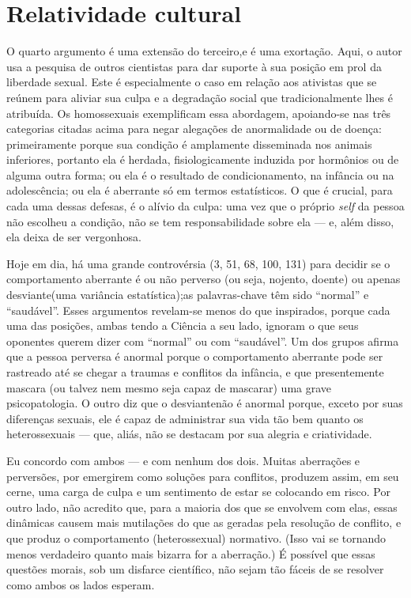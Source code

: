 \section{Relatividade cultural}

O quarto argumento é uma extensão do terceiro,\idxrela[|(] e é uma exortação.
Aqui, o autor usa a pesquisa de outros cientistas para dar suporte à
sua posição em prol da liberdade sexual. Este é especialmente o caso em
relação aos ativistas que se reúnem para aliviar sua culpa\idxculpa{} e a
degradação social que tradicionalmente lhes é atribuída. Os
homossexuais\idxhomosargu{} exemplificam essa abordagem, apoiando-se nas três
categorias citadas acima para negar alegações de anormalidade ou de
doença: primeiramente porque sua condição é amplamente disseminada nos
animais inferiores, portanto ela é herdada, fisiologicamente induzida
por hormônios ou de alguma outra forma; ou ela é o resultado de
condicionamento, na infância ou na adolescência; ou ela é aberrante só
em termos estatísticos. O que é crucial, para cada uma dessas defesas,
é o alívio da culpa:\idxculpa{} uma vez que o próprio \textit{self} da pessoa não
escolheu a condição, não se tem responsabilidade sobre ela --- e, além
disso, ela deixa de ser vergonhosa.

 Hoje em dia, há uma grande controvérsia (3, 51, 68, 100, 131) para
decidir se o comportamento aberrante é ou não perverso (ou seja,
nojento, doente) ou apenas\idxpervdesvi{} desviante\idxdesv[|(] (uma variância estatística);\idxaberrestat[|)] as
palavras-chave têm sido ``normal'' e ``saudável''. Esses argumentos
revelam-se menos do que inspirados, porque cada uma das posições, ambas
tendo a Ciência a seu lado, ignoram o que seus oponentes querem dizer
com ``normal'' ou com ``saudável''. Um dos grupos afirma que a pessoa
perversa é anormal porque o comportamento aberrante pode ser rastreado
até se chegar a traumas e conflitos da infância, e que presentemente
mascara (ou talvez nem mesmo seja capaz de mascarar) uma grave
psicopatologia. O outro diz que o desviante\idxdesv[|)] não é anormal porque,
exceto por suas diferenças sexuais, ele é capaz de administrar sua vida
tão bem quanto os heterossexuais --- que, aliás, não se destacam por sua
alegria e criatividade.

 Eu concordo com ambos --- e com nenhum dos dois. Muitas aberrações e
perversões, por emergirem como soluções para conflitos, produzem assim,
em seu cerne, uma carga de culpa\idxculpa{} e um sentimento de estar se colocando
em risco. Por outro lado, não acredito que, para a maioria dos que se
envolvem com elas, essas dinâmicas causem mais mutilações do que as
geradas pela resolução de conflito, e que produz o comportamento
(heterossexual) normativo. (Isso vai se tornando menos verdadeiro
quanto mais bizarra for a aberração.) É possível que essas questões
morais, sob um disfarce científico, não sejam tão fáceis de se
resolver como ambos os lados esperam.


